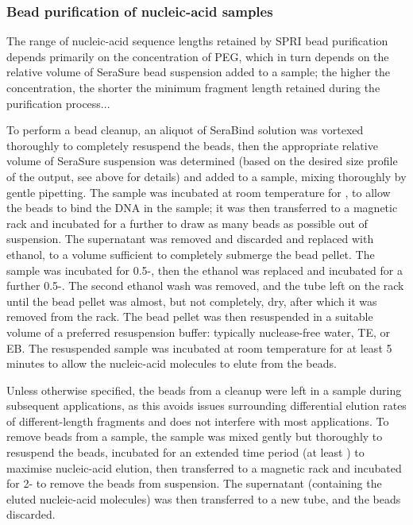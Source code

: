 
\subsubsection{Bead purification of nucleic-acid samples}

The range of nucleic-acid sequence lengths retained by SPRI bead purification depends primarily on the concentration of PEG, which in turn depends on the relative volume of SeraSure bead suspension added to a sample; the higher the concentration, the shorter the minimum fragment length retained during the purification process... %

To perform a bead cleanup, an aliquot of SeraBind solution was vortexed thoroughly to completely resuspend the beads, then the appropriate relative volume of SeraSure suspension was determined (based on the desired size profile of the output, see above for details) and added to a sample, mixing thoroughly by gentle pipetting. The sample was incubated at room temperature for , to allow the beads to bind the DNA in the sample; it was then transferred to a magnetic rack %
and incubated for a further  to draw as many beads as possible out of suspension. The supernatant was removed and discarded and replaced with  ethanol, to a volume sufficient to completely submerge the bead pellet. The sample was incubated for 0.5-, then the ethanol was replaced and incubated for a further 0.5-. The second ethanol wash was removed, and the tube left on the rack until the bead pellet was almost, but not completely, dry, after which it was removed from the rack. The bead pellet was then resuspended in a suitable volume of a preferred resuspension buffer: typically nuclease-free water, TE, or EB. The resuspended sample was incubated at room temperature for at least 5 minutes to allow the nucleic-acid molecules to elute from the beads. 


Unless otherwise specified, the beads from a cleanup were left in a sample during subsequent applications, as this avoids issues surrounding differential elution rates of different-length fragments and does not interfere with most applications. To remove beads from a sample, the sample was mixed gently but thoroughly to resuspend the beads, incubated for an extended time period (at least ) to maximise nucleic-acid elution, then transferred to a magnetic rack and incubated for 2- to remove the beads from suspension. The supernatant (containing the eluted nucleic-acid molecules) was then transferred to a new tube, and the beads discarded.

